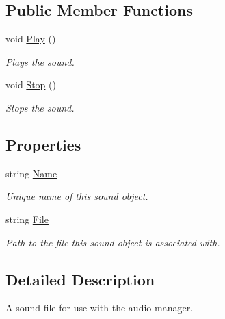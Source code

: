 \subsection*{Public Member Functions}
\begin{DoxyCompactItemize}
\item 
void \hyperlink{interface_tri_devs_1_1_tri_engine2_d_1_1_audio_1_1_i_sound_a10ce9e86e0795a89000719bc8078bfd4}{Play} ()
\begin{DoxyCompactList}\small\item\em Plays the sound. \end{DoxyCompactList}\item 
void \hyperlink{interface_tri_devs_1_1_tri_engine2_d_1_1_audio_1_1_i_sound_a9ad9c109f807052de7883d2b04995344}{Stop} ()
\begin{DoxyCompactList}\small\item\em Stops the sound. \end{DoxyCompactList}\end{DoxyCompactItemize}
\subsection*{Properties}
\begin{DoxyCompactItemize}
\item 
string \hyperlink{interface_tri_devs_1_1_tri_engine2_d_1_1_audio_1_1_i_sound_a2307573aedd92969cf3d051b395c5bc0}{Name}
\begin{DoxyCompactList}\small\item\em Unique name of this sound object. \end{DoxyCompactList}\item 
string \hyperlink{interface_tri_devs_1_1_tri_engine2_d_1_1_audio_1_1_i_sound_af308fcad8f9f11a39af7a3d253039cae}{File}
\begin{DoxyCompactList}\small\item\em Path to the file this sound object is associated with. \end{DoxyCompactList}\end{DoxyCompactItemize}


\subsection{Detailed Description}
A sound file for use with the audio manager. 



